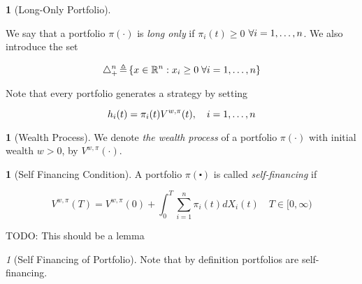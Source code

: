 \documentclass[british]{amsart}
\numberwithin{equation}{section}
\numberwithin{figure}{section}
\theoremstyle{plain}
\theoremstyle{definition}
\newtheorem{defn}[thm]{\protect\definitionname}
\theoremstyle{plain}
\theoremstyle{plain}
\theoremstyle{plain}
\theoremstyle{remark}
\newtheorem{rem}[thm]{\protect\remarkname}
\theoremstyle{plain}
\providecommand{\definitionname}{Definition}
\providecommand{\remarkname}{Remark}
\newcommand{\defeq}{\mathop{\triangleq}}
\begin{document}
\begin{defn} [Long-Only Portfolio]
	\label{def:longonlyportfolio}

	We say that a portfolio $\pi(\cdot)$ is \textit{long only} if 
	$\pi_{i}(t) \ge 0$ $\forall i=1,\dots,n$. We also introduce the set 

	\begin{equation}
		\triangle_{+}^{n} \defeq 
		\left\{ x\in\mathbb{R}^{n}:x_{i}\ge0\;\forall \rangei \right\} 
 	\end{equation}

\end{defn}

Note that every portfolio generates a strategy by setting 

\begin{equation}
	\label{eq:wealthinvestedbyportfolio}
	h_i(t) = \pi_{i}(t)V^{w,\pi}(t),
	\quad i=1,\dots,n
\end{equation}

\begin{defn} [Wealth Process]
	
	We denote \textit{the wealth process} of a portfolio $\pi(\cdot)$ with initial 
	wealth $w > 0$, by $V^{w,\pi}(\cdot)$.

\end{defn}

\begin{defn} [Self Financing Condition]
	
	A portfolio $\pi(\centerdot)$ is called \textit{self-financing} if 
	
	\begin{equation}
		V^{w,\pi}(T) = V^{w,\pi}(0) + \int_{0}^{T} \sum_{i=1}^{n} \pi_{i}(t) dX_{i}(t)
		\quad T \in [0, \infty)
 	\end{equation}

\end{defn}

TODO: This should be a lemma
\begin{rem} [Self Financing of Portfolio]
	Note that by definition portfolios are self-financing.
\end{rem}
 
\end{document}
